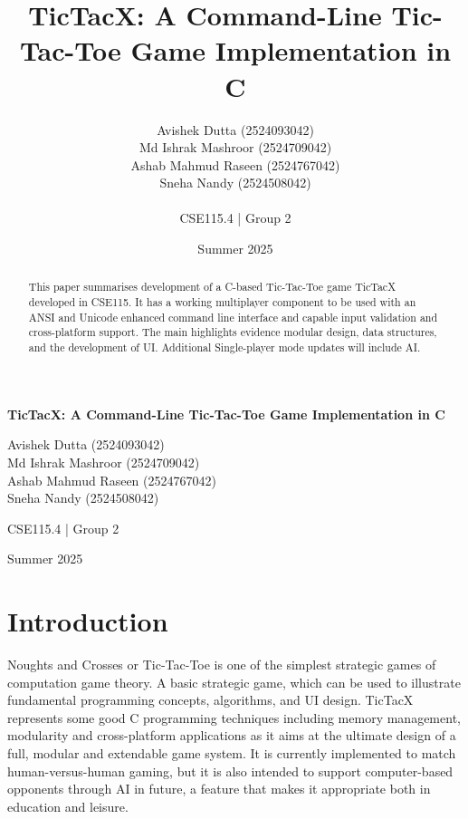 \documentclass[11pt,a4paper,twocolumn]{article}
\title{\textbf{TicTacX: A Command-Line Tic-Tac-Toe Game Implementation in C}}
\author{
    Avishek Dutta (2524093042) \\
    Md Ishrak Mashroor (2524709042) \\
    Ashab Mahmud Raseen (2524767042) \\
    Sneha Nandy (2524508042) \\
    \\
    \small CSE115.4 | Group 2
}
\date{Summer 2025}
\begin{document}
\begin{titlepage}
\thispagestyle{empty} %
\centering
\vspace*{2cm}

{\huge\textbf{TicTacX: A Command-Line Tic-Tac-Toe Game Implementation in C}\par}
\vspace{2cm}

{\large
Avishek Dutta (2524093042) \\
Md Ishrak Mashroor (2524709042) \\
Ashab Mahmud Raseen (2524767042) \\
Sneha Nandy (2524508042) \\
\par}
\vspace{1.5cm}

{\large CSE115.4 | Group 2\par}
\vspace{2cm}

{\large Summer 2025\par}

\vfill
\end{titlepage}

\setcounter{page}{2}

\twocolumn

\begin{abstract}
This paper summarises development of a C-based Tic-Tac-Toe game TicTacX developed in CSE115. It has a working multiplayer component to be used with an ANSI and Unicode enhanced command line interface and capable input validation and cross-platform support. The main highlights evidence modular design, data structures, and the development of UI. Additional Single-player mode updates will include AI.
\end{abstract}

\section{Introduction}

Noughts and Crosses or Tic-Tac-Toe is one of the simplest strategic games of computation game theory. A basic strategic game, which can be used to illustrate fundamental programming concepts, algorithms, and UI design. TicTacX represents some good C programming techniques including memory management, modularity and cross-platform applications as it aims at the ultimate design of a full, modular and extendable game system. It is currently implemented to match human-versus-human gaming, but it is also intended to support computer-based opponents through AI in future, a feature that makes it appropriate both in education and leisure.
\end{document}
